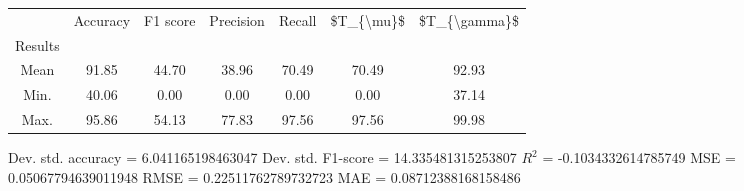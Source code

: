 \begin{tabular}{|c|c|c|c|c|c|c|}
\toprule
{} &  Accuracy &  F1 score &  Precision &  Recall &  \$T\_\{\textbackslash mu\}\$ &  \$T\_\{\textbackslash gamma\}\$ \\
Results &           &           &            &         &            &               \\
\hline
Mean    &     91.85 &     44.70 &      38.96 &   70.49 &      70.49 &         92.93 \\
Min.    &     40.06 &      0.00 &       0.00 &    0.00 &       0.00 &         37.14 \\
Max.    &     95.86 &     54.13 &      77.83 &   97.56 &      97.56 &         99.98 \\
\bottomrule
\end{tabular}

 Dev. std. accuracy = 6.041165198463047
 Dev. std. F1-score = 14.335481315253807
 $R^2$ = -0.1034332614785749
 MSE = 0.05067794639011948
 RMSE = 0.22511762789732723
 MAE = 0.08712388168158486